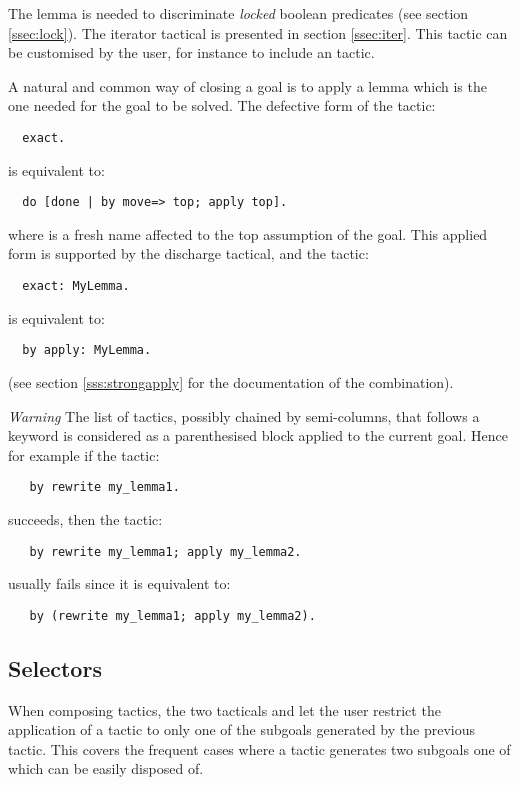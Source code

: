 The lemma  is needed to discriminate
\emph{locked} boolean predicates (see section \ref{ssec:lock}).
The iterator tactical  is presented in section
\ref{ssec:iter}.
This tactic can be customised by the user, for instance to include an
 tactic.

A natural and common way of closing a goal is to apply a lemma which
is the  one needed for the goal to be solved. The defective
form of the tactic:
\begin{lstlisting}
  exact.
\end{lstlisting}
is equivalent to:
\begin{lstlisting}
  do [done | by move=> top; apply top].
\end{lstlisting}
where  is a fresh name affected to the top assumption of the goal.
This applied form is supported by the  \C{:} discharge tactical, and
the tactic:
\begin{lstlisting}
  exact: MyLemma.
\end{lstlisting}
is equivalent to:
\begin{lstlisting}
  by apply: MyLemma.
\end{lstlisting}
(see section \ref{sss:strongapply} for the documentation of the 
combination).

\textit{Warning} The list of tactics, possibly chained by
semi-columns, that follows a  keyword is considered as a
parenthesised block
applied to the current goal. Hence for example if the tactic:
\begin{lstlisting}
   by rewrite my_lemma1.
\end{lstlisting} 
succeeds, then the tactic:
\begin{lstlisting}
   by rewrite my_lemma1; apply my_lemma2.
\end{lstlisting}
usually fails since it is equivalent to:
\begin{lstlisting}
   by (rewrite my_lemma1; apply my_lemma2).
\end{lstlisting}

\subsection{Selectors}\label{ssec:select}

When composing tactics, the two tacticals  and
 let the user restrict the application of a tactic to only one
of the subgoals generated by the previous tactic. This
covers the frequent cases where a tactic generates two subgoals one of
which can be easily disposed of.

